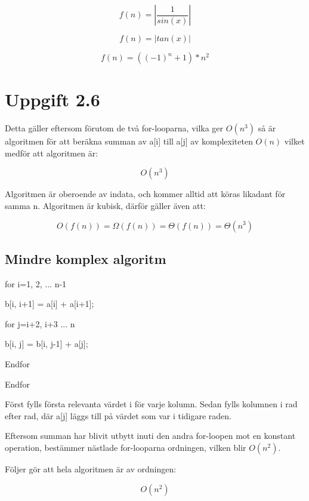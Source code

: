 \documentclass{article}
\begin{document}
	\[f(n) = |\frac{1}{sin(x)}|\]

	\[f(n) = |tan(x)|\]

	\[f(n) = ((-1)^{n}+1) * n^{2}\]


\section*{Uppgift 2.6}

	Detta gäller eftersom förutom de två for-looparna, vilka ger $O(n^{3})$ så är algoritmen för att beräkna summan av a[i] till a[j] av komplexiteten $O(n)$ vilket medför att algoritmen är:

	\[O(n^{3})\]

	Algoritmen är oberoende av indata, och kommer alltid att köras likadant för samma n. Algoritmen är kubisk, därför gäller även att:

	\[O(f(n)) = \Omega(f(n)) = \Theta(f(n)) = \Theta(n^{3})\]

	\subsection *{Mindre komplex algoritm}

	\indent \indent for i=1, 2, ... n-1 \newline

	\indent \indent b[i, i+1] = a[i] + a[i+1];\newline

	\indent \indent for j=i+2, i+3 ... n \newline

	\indent \indent \indent b[i, j] = b[i, j-1] + a[j]; \newline

	\indent \indent Endfor

	Endfor \newline

	Först fylls första relevanta värdet i för varje kolumn. Sedan fylls kolumnen i rad efter rad, där a[j] läggs till på värdet som var i tidigare raden.

	Eftersom summan har blivit utbytt inuti den andra for-loopen mot en konstant operation, bestämmer nästlade for-looparna ordningen, vilken blir $O(n^{2})$.

	Följer gör att hela algoritmen är av ordningen:

	\[O(n^{2})\]
\end{document}
